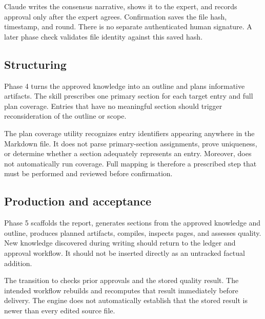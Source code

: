 \documentclass[12pt,a4paper]{article}
\newcommand{\code}[1]{\texttt{\detokenize{#1}}}
\begin{document}
Claude writes the consensus narrative, shows it to the expert, and records approval only after the expert agrees. Confirmation saves the file hash, timestamp, and round. There is no separate authenticated human signature. A later phase check validates file identity against this saved hash.

\subsection{Structuring}
Phase 4 turns the approved knowledge into an outline and plans informative artifacts. The skill prescribes one primary section for each target entry and full plan coverage. Entries that have no meaningful section should trigger reconsideration of the outline or scope.

The plan coverage utility recognizes entry identifiers appearing anywhere in the Markdown file. It does not parse primary-section assignments, prove uniqueness, or determine whether a section adequately represents an entry. Moreover, \code{confirm structure} does not automatically run coverage. Full mapping is therefore a prescribed step that must be performed and reviewed before confirmation.

\subsection{Production and acceptance}
Phase 5 scaffolds the report, generates sections from the approved knowledge and outline, produces planned artifacts, compiles, inspects pages, and assesses quality. New knowledge discovered during writing should return to the ledger and approval workflow. It should not be inserted directly as an untracked factual addition.

The transition to \code{done} checks prior approvals and the stored quality result. The intended workflow rebuilds and recomputes that result immediately before delivery. The engine does not automatically establish that the stored result is newer than every edited source file.
\end{document}
